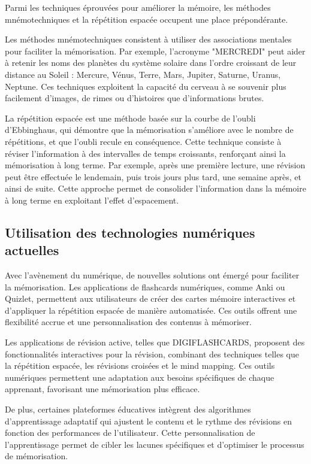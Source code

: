 \documentclass[12pt,a4paper]{report}
\begin{document}
Parmi les techniques éprouvées pour améliorer la mémoire, les méthodes mnémotechniques et la répétition espacée occupent une place prépondérante.

Les méthodes mnémotechniques consistent à utiliser des associations mentales pour faciliter la mémorisation. Par exemple, l'acronyme "MERCREDI" peut aider à retenir les noms des planètes du système solaire dans l'ordre croissant de leur distance au Soleil : Mercure, Vénus, Terre, Mars, Jupiter, Saturne, Uranus, Neptune. Ces techniques exploitent la capacité du cerveau à se souvenir plus facilement d'images, de rimes ou d'histoires que d'informations brutes. \cite{hiphiphip}

La répétition espacée est une méthode basée sur la courbe de l'oubli d'Ebbinghaus, qui démontre que la mémorisation s'améliore avec le nombre de répétitions, et que l'oubli recule en conséquence. Cette technique consiste à réviser l'information à des intervalles de temps croissants, renforçant ainsi la mémorisation à long terme. Par exemple, après une première lecture, une révision peut être effectuée le lendemain, puis trois jours plus tard, une semaine après, et ainsi de suite. Cette approche permet de consolider l'information dans la mémoire à long terme en exploitant l'effet d'espacement. \cite{memoriclub} \cite{lectureincr}

\subsection{Utilisation des technologies numériques actuelles}

Avec l'avènement du numérique, de nouvelles solutions ont émergé pour faciliter la mémorisation. Les applications de flashcards numériques, comme Anki ou Quizlet, permettent aux utilisateurs de créer des cartes mémoire interactives et d'appliquer la répétition espacée de manière automatisée. Ces outils offrent une flexibilité accrue et une personnalisation des contenus à mémoriser.

Les applications de révision active, telles que DIGIFLASHCARDS, proposent des fonctionnalités interactives pour la révision, combinant des techniques telles que la répétition espacée, les révisions croisées et le mind mapping. Ces outils numériques permettent une adaptation aux besoins spécifiques de chaque apprenant, favorisant une mémorisation plus efficace. \cite{stewdy}

De plus, certaines plateformes éducatives intègrent des algorithmes d'apprentissage adaptatif qui ajustent le contenu et le rythme des révisions en fonction des performances de l'utilisateur. Cette personnalisation de l'apprentissage permet de cibler les lacunes spécifiques et d'optimiser le processus de mémorisation.
\end{document}
